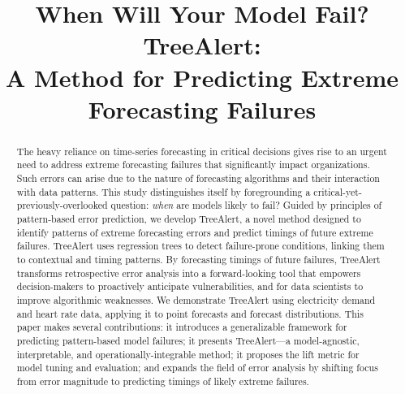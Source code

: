 \documentclass[]{interact}
\theoremstyle{definition}
\begin{document}
\title{When Will Your Model Fail? TreeAlert:\\
A Method for Predicting Extreme Forecasting Failures}
\author{}
\maketitle

\begin{abstract} %
The heavy reliance on time-series forecasting in critical decisions gives rise to an urgent need to address extreme forecasting failures that significantly impact organizations. Such errors can arise due to the nature of forecasting algorithms and their interaction with data patterns. This study distinguishes itself by foregrounding a critical-yet-previously-overlooked question: \emph{when} are models likely to fail? Guided by principles of pattern-based error prediction, we develop TreeAlert, a novel method designed to identify patterns of extreme forecasting errors and predict timings of future extreme failures. TreeAlert uses regression trees to detect failure-prone conditions, linking them to contextual and timing patterns. By forecasting timings of future failures, TreeAlert transforms retrospective error analysis into a forward-looking tool that empowers decision-makers to proactively anticipate vulnerabilities, and for data scientists to improve algorithmic weaknesses. We demonstrate TreeAlert using electricity demand and heart rate data, applying it to point forecasts and forecast distributions. This paper makes several contributions: it introduces a generalizable framework for predicting pattern-based model failures; it presents TreeAlert---a model-agnostic, interpretable, and operationally-integrable method; it proposes the lift metric for model tuning and evaluation; and expands the field of error analysis by shifting focus from error magnitude to predicting timings of likely extreme failures.

\end{abstract}
\end{document}
